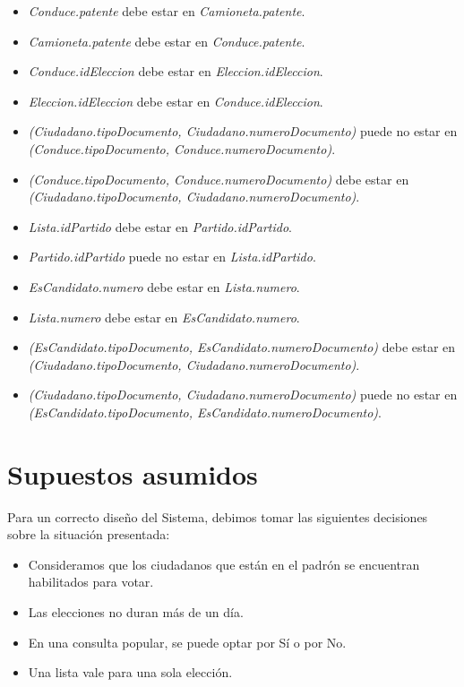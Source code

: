 \documentclass[10pt,a4paper]{article}
\begin{document}
\begin{itemize}
\item \textit{Conduce.patente} debe estar en \textit{Camioneta.patente}.

\item \textit{Camioneta.patente} debe estar en \textit{Conduce.patente}.

\item \textit{Conduce.idEleccion} debe estar en \textit{Eleccion.idEleccion}.

\item \textit{Eleccion.idEleccion} debe estar en \textit{Conduce.idEleccion}.

\item \textit{(Ciudadano.tipoDocumento, Ciudadano.numeroDocumento)} puede no estar en \textit{(Conduce.tipoDocumento, Conduce.numeroDocumento)}.

\item \textit{(Conduce.tipoDocumento, Conduce.numeroDocumento)} debe estar en \textit{(Ciudadano.tipoDocumento, Ciudadano.numeroDocumento)}.

\item \textit{Lista.idPartido} debe estar en \textit{Partido.idPartido}.

\item \textit{Partido.idPartido} puede no estar en \textit{Lista.idPartido}.

\item \textit{EsCandidato.numero} debe estar en \textit{Lista.numero}.

\item \textit{Lista.numero} debe estar en \textit{EsCandidato.numero}.

\item \textit{(EsCandidato.tipoDocumento, EsCandidato.numeroDocumento)} debe estar en \textit{(Ciudadano.tipoDocumento, Ciudadano.numeroDocumento)}.

\item \textit{(Ciudadano.tipoDocumento, Ciudadano.numeroDocumento)} puede no estar en \textit{(EsCandidato.tipoDocumento, EsCandidato.numeroDocumento)}.

\end{itemize}
\newpage
\section{Supuestos asumidos}
Para un correcto diseño del Sistema, debimos tomar las siguientes decisiones sobre la situación presentada:
\begin{itemize}
\item Consideramos que los ciudadanos que están en el padrón se encuentran habilitados para votar.
\item Las elecciones no duran más de un día.
\item En una consulta popular, se puede optar por Sí o por No.
\item Una lista vale para una sola elección.
\end{itemize}
\newpage
\end{document}
